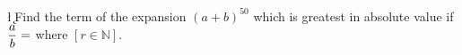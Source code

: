 
%
%
%
%      
% 
% 
%   


\vbtwo\l
\SUBTRACT{}\k 
\question Find the term of the expansion $(a+b)^{50}$ which is greatest in absolute value if $\dfrac{a}{b} = $ where $\left[ r \in \mathbb{N} \right]$.

